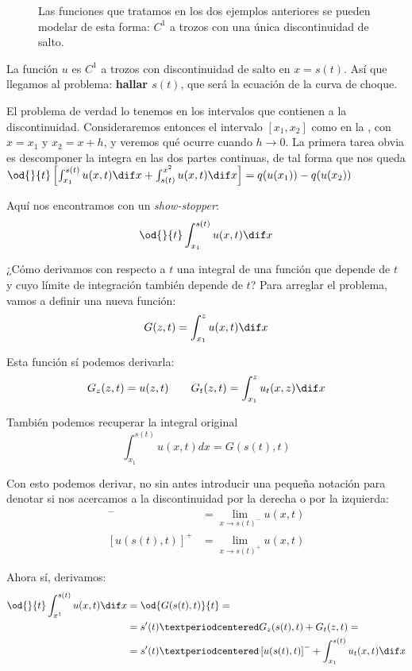 		\begin{figure}[tp]
			\centering
			\caption{Las funciones que tratamos en los dos ejemplos anteriores se pueden modelar de esta forma: $C^1$ a trozos con una única discontinuidad de salto.}
			\label{fig:discontinuidadAtasco}
		\end{figure}

		La función $u$ es $C^1$ a trozos con discontinuidad de salto en $x=s(t)$. Así que llegamos al problema:	\textbf{hallar $s(t)$}, que será la ecuación de la curva de choque.

		El problema de verdad lo tenemos en los intervalos que contienen a la discontinuidad. Consideraremos entonces el intervalo $[x_1, x_2]$ como en la , con $x = x_1$ y $x_2 = x + h$, y veremos qué ocurre cuando $h \to 0$. La primera tarea obvia es descomponer la integra en las dos partes continuas, de tal forma que nos queda \(
		\od{}{t} \left[ \int^{s(t)}_{x_1} u(x,t) \dif x + \int^{x^2}_{s(t)} u(x,t) \dif x \right] = q(u(x_1)) - q(u(x_2)) \label{eq:DescompIntervDiscontinuidad} \)

		Aquí nos encontramos con un \textit{show-stopper}: \[ \od{}{t} \int^{s(t)}_{x_1} u(x,t) \dif x \]

		¿Cómo derivamos con respecto a $t$ una integral de una función que depende de $t$ y cuyo límite de integración también depende de $t$? Para arreglar el problema, vamos a definir una nueva función: \[ G(z,t) = \int^{z}_{x_1} u(x,t) \dif x \]

		Esta función sí podemos derivarla: \[
		G_z(z,t) = u(z,t)
		\qquad
		G_t(z,t) = \int^{z}_{x_1} u_t(x,z) \dif x
		\]

		También podemos recuperar la integral original \[ \int^{s(t)}_{x_1} u(x,t) dx = G(s(t),t) \]

		Con esto podemos derivar, no sin antes introducir una pequeña notación para denotar si nos acercamos a la discontinuidad por la derecha o por la izquierda:
		\begin{align*}
		[u(s(t),t)]^{-} &= \lim_{x \to s(t)^{-}} u(x, t) \\
		[u(s(t),t)]^{+} &= \lim_{x \to s(t)^{+}} u(x, t)
		\end{align*}

		Ahora sí, derivamos:
		\begin{align*}
		\od{}{t} \int_{x^1}^{s(t)} u(x,t) \dif x
			&= \od{G(s(t), t)}{t} = \\
			&= s'(t) · G_z(s(t), t) + G_t(z,t) = \\
			&= s'(t) · \left[u(s(t), t)\right]^{-} + \int_{x_1}^{s(t)} u_t(x,t) \dif x
		\end{align*}


